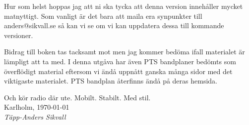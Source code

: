 Hur som helst hoppas jag att ni ska tycka att denna version innehåller
mycket matnyttigt. Som vanligt är det bara att maila era synpunkter
till anders@sikvall.se så kan vi se om vi kan uppdatera dessa till
kommande versioner.

Bidrag till boken tas tacksamt mot men jag kommer bedöma ifall
materialet är lämpligt att ta med. I denna utgåva har även PTS
bandplaner bedömts som överflödigt material eftersom vi ändå uppnått
ganska många sidor med det viktigaste materialet. PTS bandplan
återfinns ändå på deras hemsida.

Och kör radio där ute. Mobilt. Stabilt. Med stil.\\[4em]

Karlholm, \today\\
\textit{Täpp-Anders Sikvall}

\clearpage
